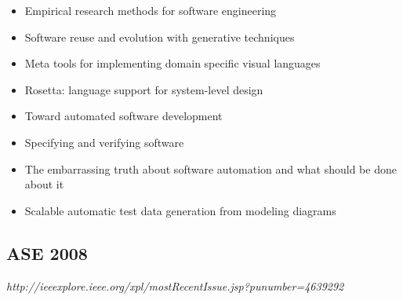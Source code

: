 {\begin{itemize}[itemsep=-1ex]
  \item Empirical research methods for software engineering
  \item Software reuse and evolution with generative techniques
  \item Meta tools for implementing domain specific visual languages
  \item Rosetta: language support for system-level design
  \item Toward automated software development
  \item Specifying and verifying software
  \item The embarrassing truth about software automation and what should be done about it
  \item Scalable automatic test data generation from modeling diagrams
\end{itemize}
}

\subsection{ASE 2008}

{\small \em http://ieeexplore.ieee.org/xpl/mostRecentIssue.jsp?punumber=4639292}

